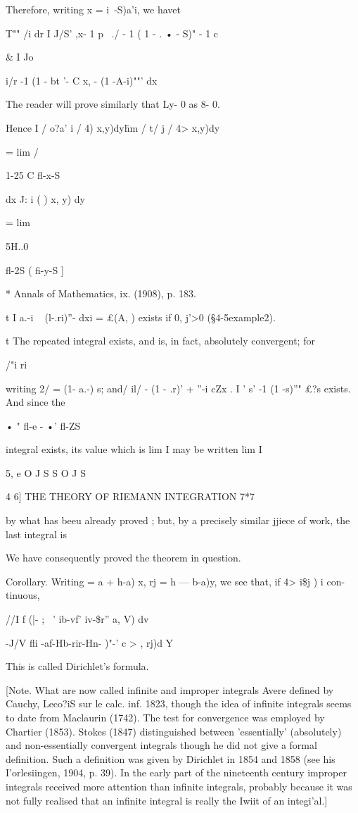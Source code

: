 Therefore, writing x = i\ -S)a'i, we havet

T"" /i dr I J/S' ,x- 1 p~ ./ - 1 ( 1 - . • - S)" - 1 c

  \& I Jo

 i/r -1 (1 - bt '- C x, - (1 -A-i)""' dx

The reader will prove similarly that Ly- 0 as 8- 0.

Hence I / o?a' i / 4) x,y)dy\= hm / t/ j / 4> x,y)dy\



= lim /



1-25 C fl-x-S

dx J: i ( ) x, y) dy



= lim

5H..0



fl-2S ( fi-y-S ]



* Annals of Mathematics, ix. (1908), p. 183.

t I a.-i ~ (l-.ri)''- dxi = £(A, ) exists if 0, j'>0 (§4-5example2).

t The repeated integral exists, and is, in fact, absolutely
convergent; for

/"i ri

writing 2/ = (1- a.-) s; and/ il/ - (1 - .r)' + ''-i cZx . I ' s' -1
(1 -s)''" £?s exists. And since the

• " fl-e - •' fl-ZS

integral exists, its value which is lim I may be written lim I

5, e O J S S O J S



4 6] THE THEORY OF RIEMANN INTEGRATION 7*7

by what has beeu already proved ; but, by a precisely similar jjiece
of work, the last integral is

We have consequently proved the theorem in question.

Corollary. Writing = a + h-a) x, rj = h — b-a)y, we see that, if 4>
i\$j ) i con- tinuous,

//I f (|- ; ~' ib-vf' iv-\$r'' a, V) dv

-J/V fli -af-Hb-rir-Hn- )"-' c > , rj)d Y

This is called Dirichlet's formula.

[Note. What are now called infinite and improper integrals Avere
defined by Cauchy, Leco?iS sur le calc. inf. 1823, though the idea of
infinite integrals seems to date from Maclaurin (1742). The test for
convergence was employed by Chartier (1853). Stokes (1847)
distinguished between 'essentially' (absolutely) and non-essentially
convergent integrals though he did not give a formal definition. Such
a definition was given by Dirichlet in 1854 and 1858 (see his
I'orlesiingen, 1904, p. 39). In the early part of the nineteenth
century improper integrals received more attention than infinite
integrals, probably because it was not fully realised that an infinite
integral is really the Iwiit of an integi'al.]

